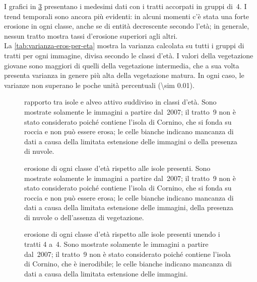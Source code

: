 I grafici in \cref{graph:erosione-classi-eta-4tr-matrix} presentano i medesimi dati con i tratti accorpati in gruppi di~4.
I trend temporali sono ancora più evidenti: in alcuni momenti c'è stata una forte erosione in ogni classe, anche se di entità decrescente secondo l'età; in generale, nessun tratto mostra tassi d'erosione superiori agli altri.
\\
La \cref{tab:varianza-eros-per-eta} mostra la varianza calcolata su tutti i gruppi di tratti per ogni immagine, divisa secondo le classi d'età.
I valori della vegetazione giovane sono maggiori di quelli della vegetazione intermedia, che a sua volta presenta varianza in genere più alta della vegetazione matura.
In ogni caso, le varianze non superano le poche unità percentuali (\num{\sim 0.01}).
%
\begin{landscape}
\begin{figure}
	\centering
	
	\vspace*{-1cm}
	\caption[rapporto tra isole e alveo attivo suddiviso in classi d'età]{rapporto tra isole e alveo attivo suddiviso in classi d'età.
	Sono mostrate solamente le immagini a partire dal~2007; il tratto~9 non è stato considerato poiché contiene l'isola di Cornino, che si fonda su roccia e non può essere erosa; le celle bianche indicano mancanza di dati a causa della limitata estensione delle immagini o della presenza di nuvole.}
	\label{graph:rapp-isl-classi-eta-matrix}
\end{figure}
\end{landscape}
%
%
\begin{landscape}
\begin{figure}
	\centering
	
	\vspace*{-1cm}
	\caption[erosione di ogni classe d'età rispetto alle isole presenti]{erosione di ogni classe d'età rispetto alle isole presenti.
	Sono mostrate solamente le immagini a partire dal~2007; il tratto~9 non è stato considerato poiché contiene l'isola di Cornino, che si fonda su roccia e non può essere erosa; le celle bianche indicano mancanza di dati a causa della limitata estensione delle immagini, della presenza di nuvole o dell'assenza di vegetazione.}
	\label{graph:erosione-classi-eta-matrix}
\end{figure}
\end{landscape}
%
%
\begin{figure}
	\centering
	
	\vspace*{-1cm}
	\caption[erosione di ogni classe d'età rispetto alle isole presenti unendo i tratti 4 a~4]{erosione di ogni classe d'età rispetto alle isole presenti unendo i tratti 4 a~4.
	Sono mostrate solamente le immagini a partire dal~2007; il tratto~9 non è stato considerato poiché contiene l'isola di Cornino, che è inerodibile; le celle bianche indicano mancanza di dati a causa della limitata estensione delle immagini.}
	\label{graph:erosione-classi-eta-4tr-matrix}
\end{figure}
